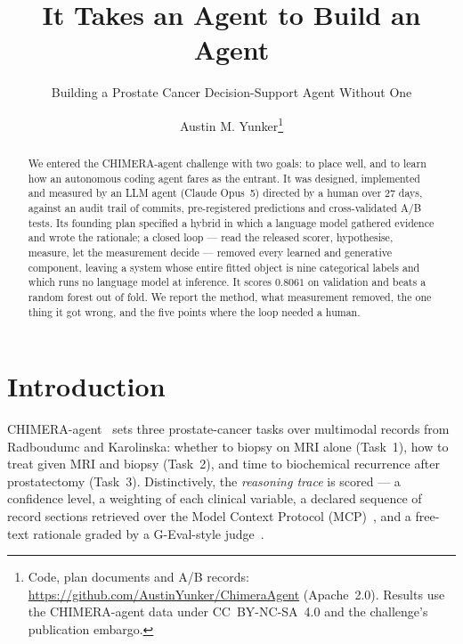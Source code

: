 \documentclass[runningheads]{llncs}
\newcommand{\todo}[1]{\textcolor{red}{[#1]}}
\begin{document}
\title{It Takes an Agent to Build an Agent}
\subtitle{Building a Prostate Cancer Decision-Support Agent Without One}

\author{Austin M. Yunker\thanks{Code, plan documents and A/B records:
\url{https://github.com/AustinYunker/ChimeraAgent} (Apache~2.0). Results use the
CHIMERA-agent data under CC~BY-NC-SA~4.0 and the challenge's publication embargo.}}
\institute{Loyola University Chicago, Chicago IL, USA \\ \email{\todo{e-mail}}}

\maketitle

\begin{abstract}
We entered the CHIMERA-agent challenge with two goals: to place well, and to learn how
an autonomous coding agent fares as the entrant. It was designed, implemented and
measured by an LLM agent (Claude Opus~5) directed by a human over 27 days, against an
audit trail of commits, pre-registered predictions and cross-validated A/B tests. Its founding plan specified a hybrid in which a
language model gathered evidence and wrote the rationale; a closed loop --- read the
released scorer, hypothesise, measure, let the measurement decide --- removed every
learned and generative component, leaving a system whose entire fitted object is
nine categorical labels and which runs no language model at inference. It scores
$0.8061$ on validation and beats a random forest out of fold. We report the method,
what measurement removed, the one thing it got wrong, and the five points where the
loop needed a human.

\end{abstract}

\section{Introduction}

CHIMERA-agent~\cite{chimera} sets three prostate-cancer tasks over multimodal
records from Radboudumc and Karolinska: whether to biopsy on MRI alone (Task~1), how
to treat given MRI and biopsy (Task~2), and time to biochemical recurrence after
prostatectomy (Task~3). Distinctively, the \emph{reasoning trace} is scored --- a
confidence level, a weighting of each clinical variable, a declared sequence of
record sections retrieved over the Model Context Protocol (MCP)~\cite{mcp}, and a
free-text rationale graded by a G-Eval-style judge~\cite{geval}.
\end{document}
